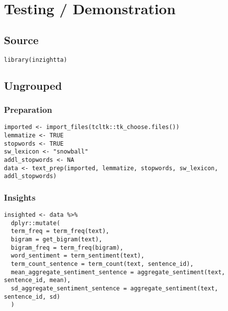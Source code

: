 \documentclass[a4paper, 11pt]{article}
\begin{document}
\section{Testing / Demonstration}
\label{sec:orgd048c9d}
\subsection{Source}
\label{sec:org9bd3edb}
\begin{verbatim}
library(inzightta)
\end{verbatim}

\subsection{Ungrouped}
\label{sec:orgf76bfe9}
\subsubsection{Preparation}
\label{sec:org8ce95bf}
\begin{verbatim}
imported <- import_files(tcltk::tk_choose.files())
lemmatize <- TRUE
stopwords <- TRUE
sw_lexicon <- "snowball"
addl_stopwords <- NA
data <- text_prep(imported, lemmatize, stopwords, sw_lexicon, addl_stopwords)
\end{verbatim}

\subsubsection{Insights}
\label{sec:orgcac2a13}
\begin{verbatim}
insighted <- data %>%
  dplyr::mutate(
  term_freq = term_freq(text),
  bigram = get_bigram(text),
  bigram_freq = term_freq(bigram),
  word_sentiment = term_sentiment(text),
  term_count_sentence = term_count(text, sentence_id),
  mean_aggregate_sentiment_sentence = aggregate_sentiment(text, sentence_id, mean),
  sd_aggregate_sentiment_sentence = aggregate_sentiment(text, sentence_id, sd)
  )
\end{verbatim}
\end{document}
